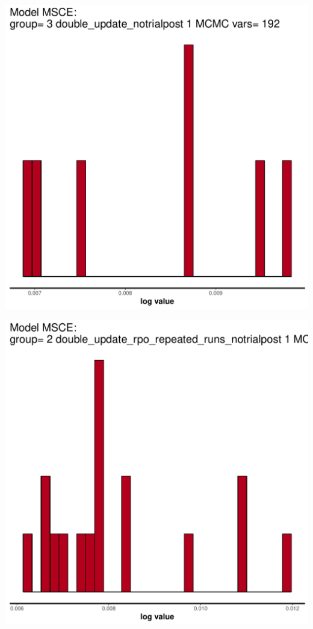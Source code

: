 \documentclass{article}\usepackage[]{graphicx}\usepackage[]{color}
\makeatletter
\def\maxwidth{ %
  \ifdim\Gin@nat@width>\linewidth
    \linewidth
  \else
    \Gin@nat@width
  \fi
}
\newenvironment{knitrout}{}{} %
\makeatother
\begin{document}
\begin{knitrout}
\includegraphics[width=\maxwidth]{figure/unnamed-chunk-12-2} 

\includegraphics[width=\maxwidth]{figure/unnamed-chunk-12-3} 


\end{knitrout}
\end{document}

